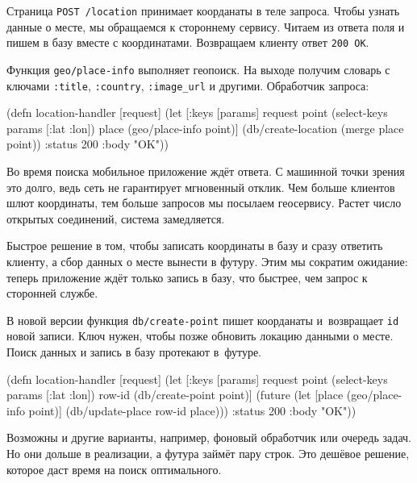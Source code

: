 Страница \verb|POST /location| принимает коорданаты в теле запроса. Чтобы
узнать данные о месте, мы обращаемся к стороннему сервису. Читаем из ответа поля
и пишем в базу вместе с координатами. Возвращаем клиенту ответ \verb|200 OK|.

Функция \verb|geo/place-info| выполняет геопоиск. На выходе получим
словарь с ключами \verb|:title|, \verb|:country|, \verb|:image_url| и
другими. Обработчик запроса:

\begin{english}
  \begin{clojure}
(defn location-handler [request]
  (let [{:keys [params]} request
        point (select-keys params [:lat :lon])
        place (geo/place-info point)]
    (db/create-location (merge place point))
    {:status 200 :body "OK"}))
  \end{clojure}
\end{english}

Во время поиска мобильное приложение ждёт ответа. С машинной точки зрения это
долго, ведь сеть не гарантирует мгновенный отклик. Чем больше клиентов шлют
координаты, тем больше запросов мы посылаем геосервису. Растет число
открытых соединений, система замедляется.


Быстрое решение в том, чтобы записать координаты в базу и сразу ответить
клиенту, а сбор данных о месте вынести в футуру. Этим мы сократим ожидание:
теперь приложение ждёт только запись в базу, что быстрее, чем запрос к сторонней
службе.

В новой версии функция \verb|db/create-point| пишет коорданаты и~возвращает
\verb|id| новой записи. Ключ нужен, чтобы позже обновить локацию данными о
месте. Поиск данных и запись в базу протекают в~футуре.

\begin{english}
  \begin{clojure}
(defn location-handler
  [request]
  (let [{:keys [params]} request
        point (select-keys params [:lat :lon])
        row-id (db/create-point point)]
    (future
      (let [place (geo/place-info point)]
        (db/update-place row-id place)))
    {:status 200 :body "OK"}))
  \end{clojure}
\end{english}

Возможны и другие варианты, например, фоновый обработчик или очередь задач. Но
они дольше в реализации, а футура займёт пару строк. Это дешёвое решение,
которое даст время на поиск оптимального.

